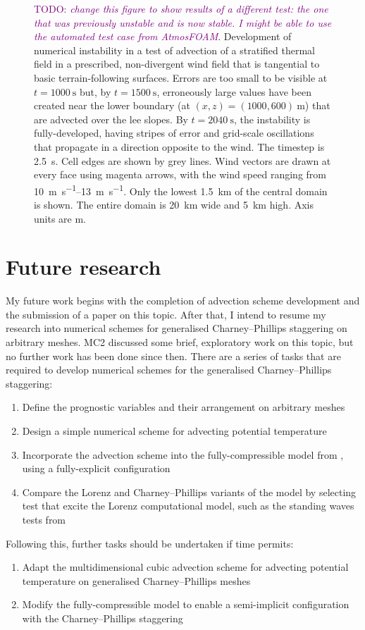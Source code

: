 \documentclass[a4paper,11pt]{article}
\newcommand{\TODO}[1]{\textcolor{purple}{TODO: \emph{#1}}}
\begin{document}
\begin{figure}
%
\caption{\TODO{change this figure to show results of a different test: the one that was previously unstable and is now stable.  I might be able to use the automated test case from AtmosFOAM}.  Development of numerical instability in a test of advection of a stratified thermal field in a prescribed, non-divergent wind field that is tangential to basic terrain-following surfaces.  Errors are too small to be visible at $t = \SI{1000}{\second}$ but, by $t = \SI{1500}{\second}$, erroneously large values have been created near the lower boundary (at $(x,z) = (1000, 600)\:\si{\meter}$) that are advected over the lee slopes.  By $t = \SI{2040}{\second}$, the instability is fully-developed, having stripes of error and grid-scale oscillations that propagate in a direction opposite to the wind.  The timestep is \SI{2.5}{\second}.
Cell edges are shown by grey lines.  Wind vectors are drawn at every face using magenta arrows, with the wind speed ranging from \SIrange{10}{13}{\meter\per\second}.  Only the lowest \SI{1.5}{\kilo\meter} of the central domain is shown.  The entire domain is \SI{20}{\kilo\meter} wide and \SI{5}{\kilo\meter} high.  Axis units are \si{\meter}.}
\label{fig:instability}
\end{figure}

\section{Future research}
\label{sec:future}

My future work begins with the completion of advection scheme development and the submission of a paper on this topic.  After that, I intend to resume my research into numerical schemes for generalised Charney--Phillips staggering on arbitrary meshes.
MC2 discussed some brief, exploratory work on this topic, but no further work has been done since then.
There are a series of tasks that are required to develop numerical schemes for the generalised Charney--Phillips staggering:
\begin{enumerate}
\item Define the prognostic variables and their arrangement on arbitrary meshes
\item Design a simple numerical scheme for advecting potential temperature
\item Incorporate the advection scheme into the fully-compressible model from \citet{weller-shahrokhi2014}, using a fully-explicit configuration
\item Compare the Lorenz and Charney--Phillips variants of the model by selecting test that excite the Lorenz computational model, such as the standing waves tests from \citet{arakawa-konor1996}
\end{enumerate}
Following this, further tasks should be undertaken if time permits:
\begin{enumerate}[resume]
\item Adapt the multidimensional cubic advection scheme for advecting potential temperature on generalised Charney--Phillips meshes
\item Modify the fully-compressible model to enable a semi-implicit configuration with the Charney--Phillips staggering
\end{enumerate}
\end{document}
